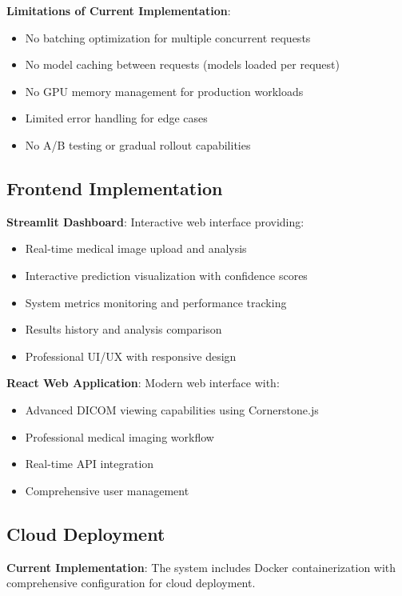 \documentclass[12pt,a4paper]{article}
\begin{document}
\textbf{Limitations of Current Implementation}:
\begin{itemize}
    \item No batching optimization for multiple concurrent requests
    \item No model caching between requests (models loaded per request)
    \item No GPU memory management for production workloads
    \item Limited error handling for edge cases
    \item No A/B testing or gradual rollout capabilities
\end{itemize}

\subsection{Frontend Implementation}

\textbf{Streamlit Dashboard}: Interactive web interface providing:
\begin{itemize}
    \item Real-time medical image upload and analysis
    \item Interactive prediction visualization with confidence scores
    \item System metrics monitoring and performance tracking
    \item Results history and analysis comparison
    \item Professional UI/UX with responsive design
\end{itemize}

\textbf{React Web Application}: Modern web interface with:
\begin{itemize}
    \item Advanced DICOM viewing capabilities using Cornerstone.js
    \item Professional medical imaging workflow
    \item Real-time API integration
    \item Comprehensive user management
\end{itemize}

\subsection{Cloud Deployment}

\textbf{Current Implementation}: The system includes Docker containerization with comprehensive configuration for cloud deployment.
\end{document}
